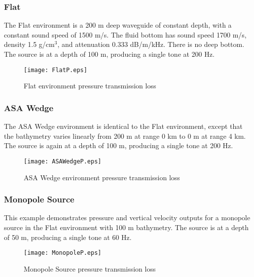 \subsubsection{Flat}

The Flat environment is a 200 m deep waveguide of constant depth, with a constant sound speed of 1500 m/s. The fluid bottom has sound speed 1700 m/s, density 1.5 g/cm$^3$, and attenuation 0.333 dB/m/kHz. There is no deep bottom. The source is at a depth of 100 m, producing a single tone at 200 Hz.

\begin{figure}[!ht]
\begin{center}
\texttt{[image: FlatP.eps]}
\caption{\label{fig:FlatP}Flat environment pressure transmission loss}
\end{center}
\end{figure}

\clearpage
\subsubsection{ASA Wedge}

The ASA Wedge environment is identical to the Flat environment, except that the bathymetry varies linearly from 200 m at range 0 km to 0 m at range 4 km. The source is again at a depth of 100 m, producing a single tone at 200 Hz.

\begin{figure}[!ht]
\begin{center}
\texttt{[image: ASAWedgeP.eps]}
\caption{\label{fig:ASAWedgeP}ASA Wedge environment pressure transmission loss}
\end{center}
\end{figure}

\clearpage
\subsubsection{Monopole Source}

This example demonstrates pressure and vertical velocity outputs for a monopole source in the Flat environment with 100 m bathymetry. The source is at a depth of 50 m, producing a single tone at 60 Hz.
 
\begin{figure}[!ht]
\begin{center}
\texttt{[image: MonopoleP.eps]}
\caption{\label{fig:MonopoleP}Monopole Source pressure transmission loss}
\end{center}
\end{figure}

